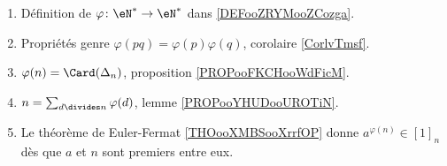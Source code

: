 		\label{THMooUDYMooCCXdbw}
\begin{enumerate}
	\item
	      Définition de \(\varphi \colon \eN^*\to \eN^*  \) dans \ref{DEFooZRYMooZCozga}.
	\item
	      Propriétés genre \( \varphi(pq)=\varphi(p)\varphi(q)\), corolaire \ref{CorlvTmsf}.
	\item
	      \( \varphi(n)=\Card(\Delta_n)\), proposition \ref{PROPooFKCHooWdFicM}.
	\item
	      \( n=\sum_{d\divides n}\varphi(d)\), lemme \ref{PROPooYHUDooUROTiN}.
	\item
	      Le théorème de Euler-Fermat \ref{THOooXMBSooXrrfOP} donne \( a^{\varphi(n)}\in[1]_n\) dès que \( a\) et \( n\) sont premiers entre eux.
\end{enumerate}
